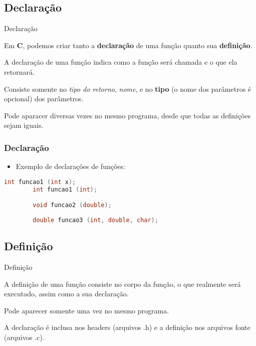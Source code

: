 \subsection{Declaração}

\begin{slide}{Declaração}

    \item Em \textbf{C}, podemos criar tanto a \textbf{declaração} de uma função quanto sua \textbf{definição}.

    \item A declaração de uma função indica como a função será chamada e o que ela retornará.

    \item Consiste somente no \textit{tipo do retorno}, \textit{nome}, e no \textbf{tipo} (o nome dos parâmetros é opcional) dos parâmetros.

    \item Pode aparacer diversas vezes no mesmo programa, desde que todas as definições sejam iguais.

\end{slide}



\begin{frame}[fragile]
\frametitle{Declaração}
    
    \begin{itemize}
        
        \item Exemplo de declarações de funções:

    \end{itemize}
    
    \begin{lstlisting}[language=C]
        int funcao1 (int x);
        int funcao1 (int);

        void funcao2 (double);
        
        double funcao3 (int, double, char);
    \end{lstlisting}
    
\end{frame}
    




\subsection{Definição}

\begin{slide}{Definição}

    \item A definição de uma função consiste no corpo da função, o que realmente será executado, assim como a sua declaração.

    \item Pode aparecer somente uma vez no mesmo programa.

    \item A declaração é inclusa nos headers (arquivos .h) e a definição nos arquivos fonte (arquivos .c).

\end{slide}



